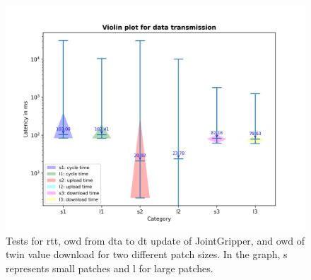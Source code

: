 \begin{figure}[htb]
    \centering
    \includegraphics[width=\textwidth]{figures/tests/DT/violin_patch_size.png}
    \caption{Tests for \gls{rtt}, \gls{owd} from \gls{dta} to \gls{dt} 
    update of JointGripper, and \gls{owd} of twin value download for 
    two different patch sizes. In the graph, s represents small patches 
    and l for large patches.\label{fig: UD-violin-patchsize}}
\end{figure}


